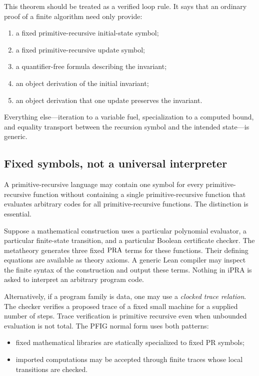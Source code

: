 This theorem should be treated as a verified loop rule.  It says that an ordinary proof of a finite algorithm need only provide:

\begin{enumerate}
\item a fixed primitive-recursive initial-state symbol;
\item a fixed primitive-recursive update symbol;
\item a quantifier-free formula describing the invariant;
\item an object derivation of the initial invariant;
\item an object derivation that one update preserves the invariant.
\end{enumerate}

Everything else---iteration to a variable fuel, specialization to a computed bound, and equality transport between the recursion symbol and the intended state---is generic.

\subsection{Fixed symbols, not a universal interpreter}

A primitive-recursive language may contain one symbol for every primitive-recursive function without containing a single primitive-recursive function that evaluates arbitrary codes for all primitive-recursive functions.  The distinction is essential.

Suppose a mathematical construction uses a particular polynomial evaluator, a particular finite-state transition, and a particular Boolean certificate checker.  The metatheory generates three fixed \(\mathrm{PRA}\) terms for these functions.  Their defining equations are available as theory axioms.  A generic Lean compiler may inspect the finite syntax of the construction and output these terms.  Nothing in iPRA is asked to interpret an arbitrary program code.

Alternatively, if a program family is data, one may use a \emph{clocked trace relation}.  The checker verifies a proposed trace of a fixed small machine for a supplied number of steps.  Trace verification is primitive recursive even when unbounded evaluation is not total.  The PFIG normal form uses both patterns:

\begin{itemize}
\item fixed mathematical libraries are statically specialized to fixed PR symbols;
\item imported computations may be accepted through finite traces whose local transitions are checked.
\end{itemize}

